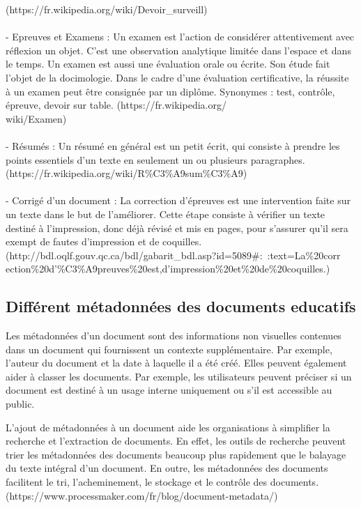 \documentclass[12pt]{report}
\begin{document}
(https://fr.wikipedia.org/wiki/Devoir\_surveill)\\
\\- Epreuves et Examens : Un examen est l'action de considérer attentivement avec réflexion un objet. C'est une observation analytique limitée dans l'espace et dans le temps.
Un examen est aussi une évaluation orale ou écrite. Son étude fait l'objet de la docimologie. Dans le cadre d'une évaluation certificative, la réussite à un examen peut être consignée par un diplôme. Synonymes : test, contrôle, épreuve, devoir sur table.
(https://fr.wikipedia.org/\\wiki/Examen)\\
\\- Résumés : Un résumé en général est un petit écrit, qui consiste à prendre les points essentiels d'un texte en seulement un ou plusieurs paragraphes.
(https://fr.wikipedia.org/wiki/R\%C3\%A9sum\%C3\%A9)\\
\\- Corrigé d’un document : La correction d'épreuves est une intervention faite sur un texte dans le but de l'améliorer. Cette étape consiste à vérifier un texte destiné à l'impression, donc déjà révisé et mis en pages, pour s'assurer qu'il sera exempt de fautes d'impression et de coquilles.
\\(http://bdl.oqlf.gouv.qc.ca/bdl/gabarit\_bdl.asp?id=5089\#:~:text=La\%20corr\\ection\%20d'\%C3\%A9preuves\%20est,d'impression\%20et\%20de\%20coquilles.)

\subsection{Différent métadonnées des documents educatifs}

Les métadonnées d'un document sont des informations non visuelles contenues dans un document qui fournissent un contexte supplémentaire. Par exemple, l'auteur du document et la date à laquelle il a été créé. Elles peuvent également aider à classer les documents. Par exemple, les utilisateurs peuvent préciser si un document est destiné à un usage interne uniquement ou s'il est accessible au public.

L'ajout de métadonnées à un document aide les organisations à simplifier la recherche et l'extraction de documents. En effet, les outils de recherche peuvent trier les métadonnées des documents beaucoup plus rapidement que le balayage du texte intégral d'un document. En outre, les métadonnées des documents facilitent le tri, l'acheminement, le stockage et le contrôle des documents.
\\(https://www.processmaker.com/fr/blog/document-metadata/)\\
\end{document}
